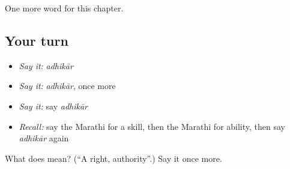 \begin{grammarlens}[title={What you've built}]
One more word for this chapter.
\end{grammarlens}

\subsection*{Your turn}
\begin{itemize}
\raggedright
  \item \emph{Say it:} \emph{adhikār}
  \item \emph{Say it:} \emph{adhikār}, once more
  \item \emph{Say it:} say \emph{adhikār}
  \item \emph{Recall:} say the Marathi for a skill, then the Marathi for ability, then say \emph{adhikār} again
\end{itemize}

\begin{tcolorbox}[breakable,colback=teal!4,colframe=teal!35!black,title={Before you move on}]
What does  mean? (\textquotedblleft{}A right, authority\textquotedblright{}.) Say it once more.
\end{tcolorbox}
